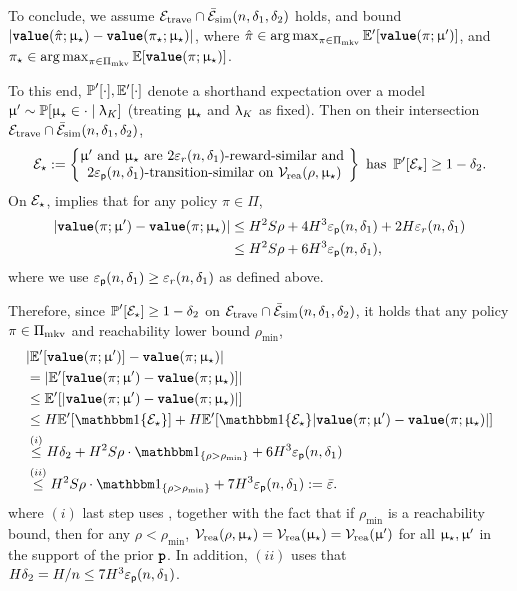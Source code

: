 To conclude, we assume $\mathcal{E}_{\mathrm{trave}} \cap \bar{\mathcal{E}}_{\mathrm{sim}}(n,\delta_1,\delta_2)$ holds, and bound  $ |{\normalfont \texttt{\textbf{value}}}(\hat{\pi};\upmu_{\star}) - {\normalfont \texttt{\textbf{value}}}(\pi_{\star};\upmu_{\star})|$,  where $\hat{\pi} \in \operatorname*{arg\,max}_{\pi \in \Pi_{\mathrm{mkv}}}\mathbb{E}'[{\normalfont \texttt{\textbf{value}}}(\pi;\upmu') ]$, and $\pi_{\star} \in \operatorname*{arg\,max}_{\pi \in \Pi_{\mathrm{mkv}}}\mathbb{E}[{\normalfont \texttt{\textbf{value}}}(\pi;\upmu_{\star}) ]$.


To this end, $\operatorname{\mathbb{P}}'[\cdot], \mathbb{E}'[\cdot]$ denote a shorthand expectation over a model $\upmu' \sim \operatorname{\mathbb{P}}[\upmu_{\star} \in \cdot \mid \uplambda_K]$ (treating $\upmu_{\star}$ and $\uplambda_K$ as fixed).  Then on their intersection $\mathcal{E}_{\mathrm{trave}} \cap \bar{\mathcal{E}}_{\mathrm{sim}}(n,\delta_1,\delta_2)$,
\begin{align}\label{eq:pEst}
\mathcal{E}_{\star} := \left\{ \begin{matrix} \upmu' \text{ and }\upmu_{\star} \text{ are } 2\varepsilon_{r}(n,\delta_1)\text{-reward-similar and }\\
 2\varepsilon_{\mathsf{p}}(n,\delta_1)\text{-transition-similar} \text{ on } \mathcal{V}_{\mathrm{rea}}(\rho,\upmu_{\star})\end{matrix}\right\} \text{ has } \operatorname{\mathbb{P}}'[\mathcal{E}_{\star}] \ge 1 - \delta_2.
\end{align}
On $\mathcal{E}_{\star}$,  implies that for any policy $\pi \in \Pi$,
\begin{equation}\label{eq:eprime_diff}
\begin{aligned}
|{\normalfont \texttt{\textbf{value}}}(\pi;\upmu')  - {\normalfont \texttt{\textbf{value}}}(\pi;\upmu_{\star})| &\le H^2 S \rho + 4 H^3 \varepsilon_{\mathsf{p}}(n,\delta_1) + 2H\varepsilon_{r}(n,\delta_1) \\
&\le H^2 S \rho + 6H^3 \varepsilon_{\mathsf{p}}(n,\delta_1),
\end{aligned}
\end{equation}
where we use $\varepsilon_{\mathsf{p}}(n,\delta_1) \ge \varepsilon_{r}(n,\delta_1)$ as defined above.

Therefore, since $\operatorname{\mathbb{P}}'[\mathcal{E}_{\star}] \ge 1 - \delta_2$ on $\mathcal{E}_{\mathrm{trave}} \cap \bar{\mathcal{E}}_{\mathrm{sim}}(n,\delta_1,\delta_2)$, it holds that any policy $\pi \in \Pi_{\mathrm{mkv}}$ and reachability lower bound $\rho_{\min}$,
\begin{align*}
&|\Exp'[\valuef{\pi}{\model'} ] - \valuef{\pi}{\modst}| \\
&= |\Exp'[\valuef{\pi}{\model'} - \valuef{\pi}{\modst}]| \\
&\le \Exp'[|\valuef{\pi}{\model'} - \valuef{\pi}{\modst}|]\\
&\le H\Exp'[\ind\{\calE_\star\}] + H\Exp'[\ind\{\calE_{\star}\}|\valuef{\pi}{\model'} - \valuef{\pi}{\modst}|]\\
&\overset{(i)}{\le}  H\delta_2 + H^2 S \rho \cdot \ind_{\{\rho > \rho_{\min}\}}+ 6H^3 \epsp(n,\delta_1)\\
&\overset{(ii)}{\le}H^2 S \rho \cdot \ind_{\{\rho > \rho_{\min}\}}+ 7 H^3 \epsp(n,\delta_1) := \bar{\varepsilon}.
\end{align*}
where $(i)$ last step uses , together with the fact that if $\rho_{\min}$ is a reachability bound, then for any $\rho < \rho_{\min}$, $\mathcal{V}_{\mathrm{rea}}(\rho,\upmu_{\star}) = \mathcal{V}_{\mathrm{rea}}(\upmu_{\star}) = \mathcal{V}_{\mathrm{rea}}(\upmu')$ for all $\upmu_{\star},\upmu'$ in the support of the prior ${\normalfont \texttt{\textbf{p}}}$. In addition, $(ii)$ uses that $H\delta_2 = H/n \le 7 H^3 \varepsilon_{\mathsf{p}}(n,\delta_1)$.

